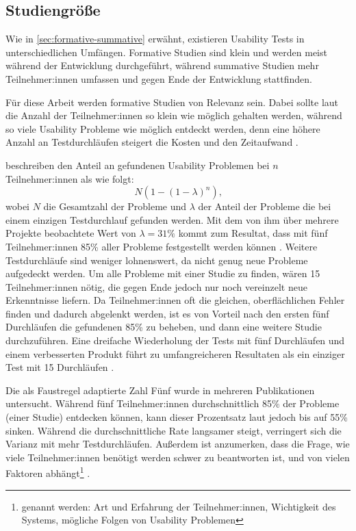 \subsection{Studiengröße}
\label{sec:study-size}

Wie in \ref{sec:formative-summative} erwähnt, existieren Usability Tests in unterschiedlichen Umfängen. Formative Studien sind klein und werden meist während der Entwicklung durchgeführt, während summative Studien mehr Teilnehmer:innen umfassen und gegen Ende der Entwicklung stattfinden.

Für diese Arbeit werden formative Studien von Relevanz sein. Dabei sollte laut \textcite{nielsenWhyYou2000} die Anzahl der Teilnehmer:innen so klein wie möglich gehalten werden, während so viele Usability Probleme wie möglich entdeckt werden, denn eine höhere Anzahl an Testdurchläufen steigert die Kosten und den Zeitaufwand \parencites{faulknerFiveuserAssumption2003}.

\textcite{nielsenMathematicalModel1993} beschreiben den Anteil an gefundenen Usability Problemen bei
$n$ Teilnehmer:innen als wie folgt:
\begin{equation}
  \label{equ:finding-usability-problems}
  N(1-(1-\lambda{})^n)\text{,}
\end{equation}
wobei $N$ die Gesamtzahl der Probleme und $\lambda{}$ der Anteil der Probleme die bei einem einzigen Testdurchlauf gefunden werden. Mit dem von ihm über mehrere Projekte beobachtete Wert von $\lambda{}=31\%$ kommt \citeauthor{nielsenWhyYou2000} zum Resultat, dass mit fünf Teilnehmer:innen 85\% aller Probleme festgestellt werden können \parencite{nielsenWhyYou2000}. Weitere Testdurchläufe sind weniger lohnenswert, da nicht genug neue Probleme aufgedeckt werden. Um alle Probleme mit einer Studie zu finden, wären 15 Teilnehmer:innen nötig, die gegen Ende jedoch nur noch vereinzelt neue Erkenntnisse liefern. Da Teilnehmer:innen oft die gleichen, oberflächlichen Fehler finden und dadurch abgelenkt werden, ist es von Vorteil nach den ersten fünf Durchläufen die gefundenen 85\% zu beheben, und dann eine weitere Studie durchzuführen. Eine dreifache Wiederholung der Tests mit fünf Durchläufen und einem verbesserten Produkt führt zu umfangreicheren Resultaten als ein einziger Test mit 15 Durchläufen \parencite{nielsenWhyYou2000}.

Die als Faustregel adaptierte Zahl Fünf wurde in mehreren Publikationen untersucht. Während fünf Teilnehmer:innen durchschnittlich 85\% der Probleme (einer Studie) entdecken können, kann dieser Prozentsatz laut \textcite{faulknerFiveuserAssumption2003} jedoch bis auf 55\% sinken. Während die durchschnittliche Rate langsamer steigt, verringert sich die Varianz mit mehr Testdurchläufen. Außerdem ist anzumerken, dass die Frage, wie viele Teilnehmer:innen benötigt werden schwer zu beantworten ist, und von vielen Faktoren abhängt\footnote{genannt werden: Art und Erfahrung der Teilnehmer:innen, Wichtigkeit des Systems, mögliche Folgen von Usability Problemen} \parencite{faulknerFiveuserAssumption2003}.


